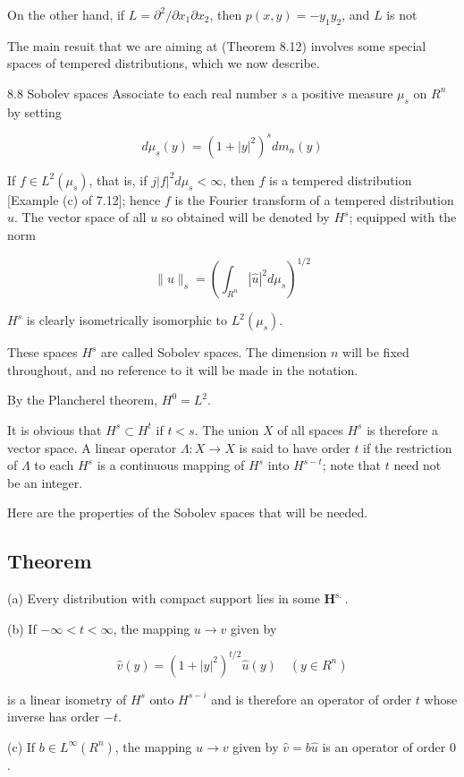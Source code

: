 \documentclass[10pt]{article}
\begin{document}
On the other hand, if $L=\partial^{2} / \partial x_{1} \partial x_{2}$, then $p(x, y)=-y_{1} y_{2}$, and $L$ is not

The main resuit that we are aiming at (Theorem 8.12) involves some special spaces of tempered distributions, which we now describe.

8.8 Sobolev spaces Associate to each real number $s$ a positive measure $\mu_{s}$ on $R^{n}$ by setting

$$
d \mu_{s}(y)=\left(1+|y|^{2}\right)^{s} d m_{n}(y)
$$

If $f \in L^{2}\left(\mu_{s}\right)$, that is, if $j|f|^{2} d \mu_{s}<\infty$, then $f$ is a tempered distribution [Example (c) of 7.12]; hence $f$ is the Fourier transform of a tempered distribution $u$. The vector space of all $u$ so obtained will be denoted by $H^{s}$; equipped with the norm

$$
\|u\|_{s}=\left(\int_{R^{n}}|\hat{u}|^{2} d \mu_{s}\right)^{1 / 2}
$$

$H^{s}$ is clearly isometrically isomorphic to $L^{2}\left(\mu_{s}\right)$.

These spaces $H^{s}$ are called Sobolev spaces. The dimension $n$ will be fixed throughout, and no reference to it will be made in the notation.

By the Plancherel theorem, $H^{0}=L^{2}$.

It is obvious that $H^{s} \subset H^{t}$ if $t<s$. The union $X$ of all spaces $H^{s}$ is therefore a vector space. A linear operator $\Lambda: X \rightarrow X$ is said to have order $t$ if the restriction of $\Lambda$ to each $H^{s}$ is a continuous mapping of $H^{s}$ into $H^{s-t}$; note that $t$ need not be an integer.

Here are the properties of the Sobolev spaces that will be needed.

\subsection{Theorem}
(a) Every distribution with compact support lies in some $\boldsymbol{H}^{\text {s. }}$.

(b) If $-\infty<t<\infty$, the mapping $u \rightarrow v$ given by

$$
\hat{v}(y)=\left(1+|y|^{2}\right)^{t / 2} \hat{u}(y) \quad\left(y \in R^{n}\right)
$$

is a linear isometry of $H^{s}$ onto $H^{s-i}$ and is therefore an operator of order $t$ whose inverse has order $-t$.

(c) If $b \in L^{\infty}\left(R^{n}\right)$, the mapping $u \rightarrow v$ given by $\hat{v}=b \hat{u}$ is an operator of order 0 .
\end{document}
